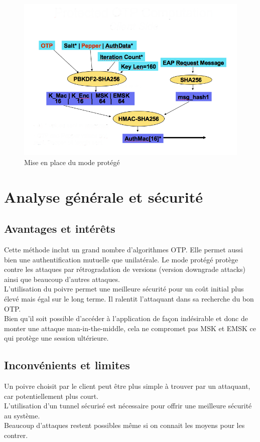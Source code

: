 \documentclass{../res/univ-projet}
\begin{document}
\begin{figure}[!h]
  \centering
  \includegraphics[width=400pt]{image3.png}
  \caption{Mise en place du mode protégé}
  \label{fig:image}
\end{figure}

\section{Analyse générale et sécurité}

\subsection{Avantages et intér\^ets}
  Cette méthode inclut un grand nombre d'algorithmes OTP.
  Elle permet aussi bien une authentification mutuelle que unilatérale.
  Le mode protégé protège contre les attaques par rétrogradation de versions (version downgrade attacks) ainsi que beaucoup d'autres attaques.\\
  L'utilisation du poivre permet une meilleure sécurité pour un coût initial plus élevé mais égal sur le long terme.
  Il ralentit l'attaquant dans sa recherche du bon OTP.\\
  
  Bien qu'il soit possible d'accéder à l'application de façon indésirable et donc de monter une attaque man-in-the-middle, cela ne compromet pas MSK et EMSK ce qui protège une session ultérieure.
  
  \subsection{Inconvénients et limites}
  Un poivre choisit par le client peut être plus simple à trouver par un attaquant, car potentiellement plus court.\\
  L'utilisation d'un tunnel sécurisé est nécessaire pour offrir une meilleure sécurité au système.\\
  Beaucoup d'attaques restent possibles même si on connait les moyens pour les contrer.
\end{document}
